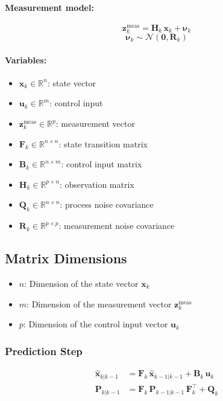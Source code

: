\documentclass[11pt,letterpaper]{article}
\begin{document}
\paragraph{Measurement model:}
\begin{equation}
    \mathbf{z}^{\text{meas}}_k = \mathbf{H}_k \, \mathbf{x}_k + \boldsymbol{\nu}_k
\end{equation}
\begin{equation}
    \boldsymbol{\nu}_k \sim \mathcal{N}(\mathbf{0}, \mathbf{R}_k)
\end{equation}

\paragraph{Variables:}
\begin{itemize}
    \item \( \mathbf{x}_k \in \mathbb{R}^n \): state vector
    \item \( \mathbf{u}_k \in \mathbb{R}^m \): control input
    \item \( \mathbf{z}^{\text{meas}}_k \in \mathbb{R}^p \): measurement vector
    \item \( \mathbf{F}_k \in \mathbb{R}^{n \times n} \): state transition matrix
    \item \( \mathbf{B}_k \in \mathbb{R}^{n \times m} \): control input matrix
    \item \( \mathbf{H}_k \in \mathbb{R}^{p \times n} \): observation matrix
    \item \( \mathbf{Q}_k \in \mathbb{R}^{n \times n} \): process noise covariance
    \item \( \mathbf{R}_k \in \mathbb{R}^{p \times p} \): measurement noise covariance
\end{itemize}

\subsection*{Matrix Dimensions}
\begin{itemize}
  \item $n$: Dimension of the state vector $\bm{x}_k$
  \item $m$: Dimension of the measurement vector $\bm{z}_k^{\text{meas}}$
  \item $p$: Dimension of the control input vector $\bm{u}_k$
\end{itemize}

\subsubsection*{Prediction Step}
\begin{align}
    \hat{\mathbf{x}}_{k|k-1} &= \mathbf{F}_k \, \hat{\mathbf{x}}_{k-1|k-1} + \mathbf{B}_k \, \mathbf{u}_k \\
    \mathbf{P}_{k|k-1} &= \mathbf{F}_k \, \mathbf{P}_{k-1|k-1} \, \mathbf{F}_k^\top + \mathbf{Q}_k
\end{align}
\end{document}
